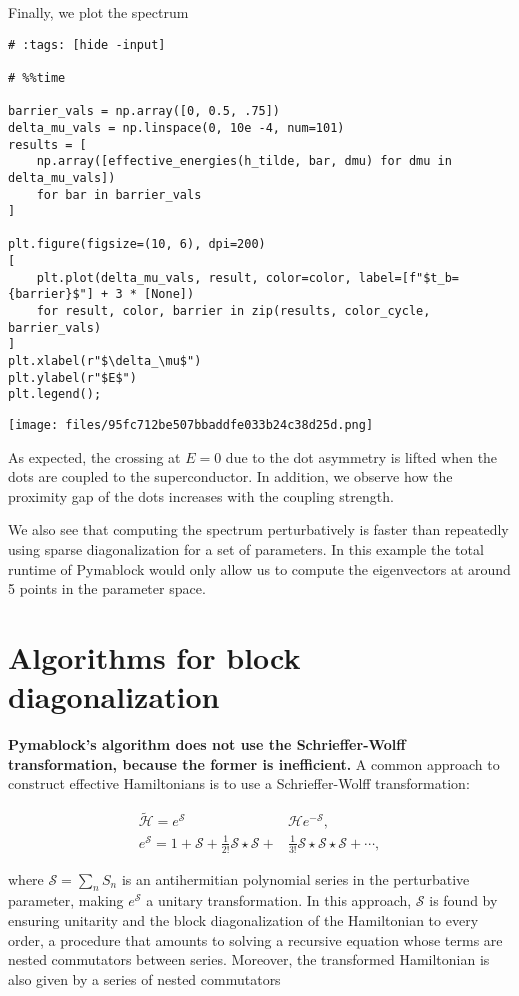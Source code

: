 \documentclass[submission, Codebases]{SciPost}
\begin{document}
{{Finally, we plot the spectrum

\begin{verbatim}
# :tags: [hide -input]

# %%time

barrier_vals = np.array([0, 0.5, .75])
delta_mu_vals = np.linspace(0, 10e -4, num=101)
results = [
    np.array([effective_energies(h_tilde, bar, dmu) for dmu in delta_mu_vals])
    for bar in barrier_vals
]

plt.figure(figsize=(10, 6), dpi=200)
[
    plt.plot(delta_mu_vals, result, color=color, label=[f"$t_b={barrier}$"] + 3 * [None])
    for result, color, barrier in zip(results, color_cycle, barrier_vals)
]
plt.xlabel(r"$\delta_\mu$")
plt.ylabel(r"$E$")
plt.legend();
\end{verbatim}

\texttt{[image: files/95fc712be507bbaddfe033b24c38d25d.png]}

As expected, the crossing at $E=0$ due to the dot asymmetry is lifted when the
dots are coupled to the superconductor. In addition, we observe how the
proximity gap of the dots increases with the coupling strength.

We also see that computing the spectrum perturbatively is faster than
repeatedly using sparse diagonalization for a set of parameters.
In this example the total runtime of Pymablock would only allow us to compute
the  eigenvectors at around 5 points in the parameter space.

\section{Algorithms for block diagonalization}

\textbf{Pymablock's algorithm does not use the Schrieffer-Wolff transformation,
because the former is inefficient.}
A common approach to construct effective Hamiltonians is to use a
Schrieffer-Wolff transformation:

\begin{equation}
\begin{align}
\tilde{\mathcal{H}} = e^\mathcal{S} &\mathcal{H} e^{-\mathcal{S}}, \\
e^{\mathcal{S}} = 1 + \mathcal{S} + \frac{1}{2!} \mathcal{S} \star \mathcal{S}
+ &\frac{1}{3!} \mathcal{S} \star \mathcal{S} \star \mathcal{S} + \cdots,
\end{align}
\end{equation}

where $\mathcal{S} = \sum_n S_n$ is an antihermitian polynomial series in the
perturbative parameter, making $e^\mathcal{S}$ a unitary transformation.
In this approach, $\mathcal{S}$ is found by ensuring unitarity and the block
diagonalization of the Hamiltonian to every order, a procedure that amounts to
solving a recursive equation whose terms are nested commutators between series.
Moreover, the transformed Hamiltonian is also given by a series of nested
commutators

}}
\end{document}

